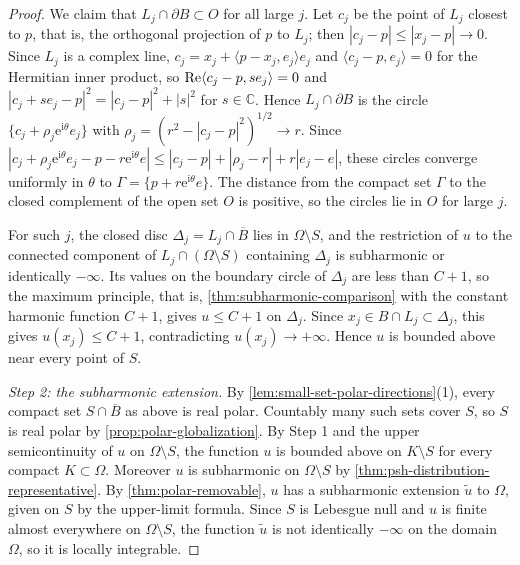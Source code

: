 \begin{proof}
We claim that $L_j\cap\partial B\subset O$ for all large $j$. Let $c_j$ be the point of $L_j$ closest to $p$, that is, the orthogonal projection of $p$ to $L_j$; then $|c_j-p|\leq|x_j-p|\to0$. Since $L_j$ is a complex line, $c_j=x_j+\langle p-x_j,e_j\rangle e_j$ and $\langle c_j-p,e_j\rangle=0$ for the Hermitian inner product, so $\operatorname{Re}\langle c_j-p,se_j\rangle=0$ and $|c_j+se_j-p|^2=|c_j-p|^2+|s|^2$ for $s\in\mathbb{C}$. Hence $L_j\cap\partial B$ is the circle $\{c_j+\rho_j\mathrm{e}^{\mathrm{i}\theta}e_j\}$ with $\rho_j=(r^2-|c_j-p|^2)^{1/2}\to r$. Since $|c_j+\rho_j\mathrm{e}^{\mathrm{i}\theta}e_j-p-r\mathrm{e}^{\mathrm{i}\theta}e|\leq|c_j-p|+|\rho_j-r|+r|e_j-e|$, these circles converge uniformly in $\theta$ to $\Gamma=\{p+r\mathrm{e}^{\mathrm{i}\theta}e\}$. The distance from the compact set $\Gamma$ to the closed complement of the open set $O$ is positive, so the circles lie in $O$ for large $j$.

For such $j$, the closed disc $\Delta_j=L_j\cap\overline B$ lies in $\Omega\setminus S$, and the restriction of $u$ to the connected component of $L_j\cap(\Omega\setminus S)$ containing $\Delta_j$ is subharmonic or identically $-\infty$. Its values on the boundary circle of $\Delta_j$ are less than $C+1$, so the maximum principle, that is, \cref{thm:subharmonic-comparison} with the constant harmonic function $C+1$, gives $u\leq C+1$ on $\Delta_j$. Since $x_j\in B\cap L_j\subset\Delta_j$, this gives $u(x_j)\leq C+1$, contradicting $u(x_j)\to+\infty$. Hence $u$ is bounded above near every point of $S$.

\emph{Step 2: the subharmonic extension.} By \cref{lem:small-set-polar-directions}(1), every compact set $S\cap\overline B$ as above is real polar. Countably many such sets cover $S$, so $S$ is real polar by \cref{prop:polar-globalization}. By Step 1 and the upper semicontinuity of $u$ on $\Omega\setminus S$, the function $u$ is bounded above on $K\setminus S$ for every compact $K\subset\Omega$. Moreover $u$ is subharmonic on $\Omega\setminus S$ by \cref{thm:psh-distribution-representative}. By \cref{thm:polar-removable}, $u$ has a subharmonic extension $\widetilde u$ to $\Omega$, given on $S$ by the upper-limit formula. Since $S$ is Lebesgue null and $u$ is finite almost everywhere on $\Omega\setminus S$, the function $\widetilde u$ is not identically $-\infty$ on the domain $\Omega$, so it is locally integrable.


\end{proof}
